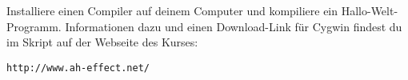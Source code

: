 \begin{aufg}
Installiere einen Compiler auf deinem Computer und kompiliere ein Hallo-Welt-Programm. Informationen dazu und einen Download-Link für Cygwin findest du im Skript auf der Webseite des Kurses:
\begin{center}
	\verb|http://www.ah-effect.net/ |
\end{center}
\end{aufg}
